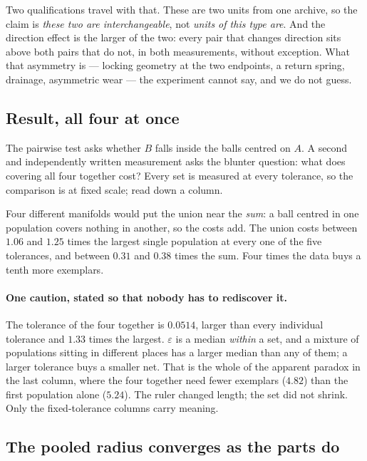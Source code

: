 \documentclass[10pt]{article}
\theoremstyle{plain}
\theoremstyle{definition}
\theoremstyle{remark}
\begin{document}
Two qualifications travel with that. These are two units from one archive, so
the claim is \emph{these two are interchangeable}, not \emph{units of this type
are}. And the direction effect is the larger of the two: every pair that
changes direction sits above both pairs that do not, in both measurements,
without exception. What that asymmetry is --- locking geometry at the two
endpoints, a return spring, drainage, asymmetric wear --- the experiment cannot
say, and we do not guess.

\subsection*{Result, all four at once}

The pairwise test asks whether $B$ falls inside the balls centred on $A$. A
second and independently written measurement asks the blunter question: what
does covering all four together cost? Every set is measured at every tolerance,
so the comparison is at fixed scale; read down a column.

\begin{center}\small

\end{center}

Four different manifolds would put the union near the \emph{sum}: a ball
centred in one population covers nothing in another, so the costs add. The
union costs between $1.06$ and $1.25$ times the largest single population at
every one of the five tolerances, and between $0.31$ and $0.38$ times the sum.
Four times the data buys a tenth more exemplars.

\paragraph{One caution, stated so that nobody has to rediscover it.} The
tolerance of the four together is $0.0514$, larger than every individual
tolerance and $1.33$ times the largest. $\varepsilon$ is a median \emph{within}
a set, and a mixture of populations sitting in different places has a larger
median than any of them; a larger tolerance buys a smaller net. That is the
whole of the apparent paradox in the last column, where the four together need
fewer exemplars ($4.82$) than the first population alone ($5.24$). The ruler
changed length; the set did not shrink. Only the fixed-tolerance columns carry
meaning.

\subsection*{The pooled radius converges as the parts do}
\end{document}
